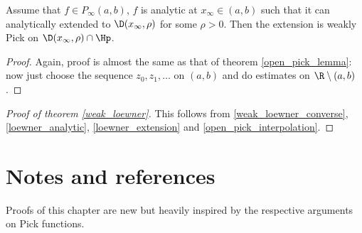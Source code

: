 \begin{lem}\label{loewner_extension}
	Assume that $f \in P_{\infty}(a, b)$, $f$ is analytic at $x_{\infty} \in (a, b)$ such that it can analytically extended to $\D(x_{\infty}, \rho)$ for some $\rho > 0$. Then the extension is weakly Pick on $\D(x_{\infty}, \rho) \cap \Hp$.
\end{lem}
\begin{proof}
	Again, proof is almost the same as that of theorem \ref{open_pick_lemma}: now just choose the sequence $z_{0}, z_{1}, \ldots$ on $(a, b)$ and do estimates on $\R \setminus (a, b)$.
\end{proof}

\begin{proof}[Proof of theorem \ref{weak_loewner}]
	This follows from \ref{weak_loewner_converse}, \ref{loewner_analytic}, \ref{loewner_extension} and \ref{open_pick_interpolation}.
\end{proof}

\section{Notes and references}

Proofs of this chapter are new but heavily inspired by the respective arguments on Pick functions.

